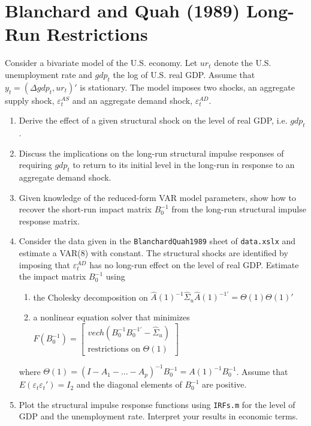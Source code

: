 \documentclass[a4paper]{scrartcl}
\begin{document}
\section{Blanchard and Quah (1989) Long-Run Restrictions}
Consider a bivariate model of the U.S. economy. Let $ur_t$ denote the U.S. unemployment rate
and $gdp_t$ the log of U.S. real GDP. Assume that $y_t = (\Delta gdp_t, ur_t)'$ is stationary. The model imposes two shocks, an aggregate supply shock, $\varepsilon_t^{AS}$ and an aggregate demand shock, $\varepsilon_t^{AD}$.

\begin{enumerate}
	\item Derive the effect of a given structural shock on the level of real GDP, i.e. $gdp_t$. 
	\item Discuss the implications  on the long-run structural impulse responses of requiring $gdp_t$ to return to its initial level in the long-run in response to an aggregate demand shock.
	\item Given knowledge of the reduced-form VAR model parameters, show how to recover the short-run impact matrix $B_0^{-1}$ from the long-run structural impulse response matrix.
	\item Consider the data given in the \texttt{BlanchardQuah1989} sheet of \texttt{data.xslx} and estimate a VAR(8) with constant. The structural shocks are identified by imposing that $\varepsilon_t^{AD}$ has no long-run effect on the level of real GDP. Estimate the impact matrix $B_0^{-1}$ using 
	\begin{enumerate}
		\item the Cholesky decomposition on $\hat{A}(1)^{-1}\hat{\Sigma}_u\hat{A}(1)^{-1'}= \Theta(1) \Theta(1)'$
		\item a nonlinear equation solver that minimizes $F(B_0^{-1}) = \begin{bmatrix}
		vech(B_0^{-1}B_0^{-1'}-\hat{\Sigma}_u)\\
		\text{restrictions on } \Theta(1)
		\end{bmatrix}$
	\end{enumerate}
where $\Theta(1)=(I-A_1-...-A_p)^{-1}B_0^{-1} = A(1)^{-1}B_0^{-1}$. Assume that
 $E(\varepsilon_t\varepsilon_t')=I_2$ and the diagonal elements of $B_0^{-1}$ are positive.
	\item Plot the structural impulse response functions using \texttt{IRFs.m} for the level of GDP and the unemployment rate. Interpret your results in economic terms.
\end{enumerate}
\newpage
\end{document}
